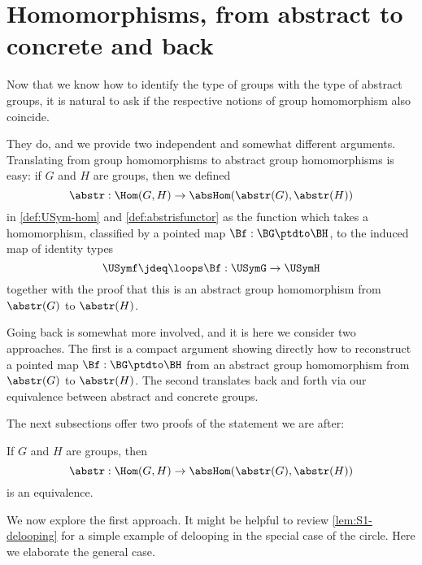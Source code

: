 \section{Homomorphisms, from abstract to concrete and back}
\label{sec:homabsisconcr}

Now that we know how to identify the type of groups with the type 
of abstract groups, it is natural to ask if the respective notions of 
group homomorphism also coincide.

They do, and we provide two independent and somewhat different arguments.
Translating from group homomorphisms to abstract group homomorphisms is easy:
if $G$ and $H$ are groups, then we defined
$$\abstr:\Hom(G,H)\to\absHom(\abstr(G),\abstr(H))$$
in \cref{def:USym-hom} and \cref{def:abstrisfunctor} as the function
which takes a homomorphism, classified by a pointed map $\Bf:\BG\ptdto\BH$,
to the induced map of identity types
$$\USymf \jdeq \loops\Bf:\USymG\to\USymH$$
together with the proof that this is an abstract group 
homomorphism from $\abstr(G)$ to $\abstr(H)$.

Going back is somewhat more involved, and it is here we consider
two approaches. The first is a compact argument showing directly how to
reconstruct a pointed map $\Bf:\BG\ptdto\BH$ from an abstract group
homomorphism from $\abstr(G)$ to $\abstr(H)$. The second translates 
back and forth via our equivalence between abstract and concrete groups.

The next subsections offer two proofs of the statement we are after:
\begin{lemma}
  \label{lem:homomabstrconcr}
  If $G$ and $H$ are groups, then
$$\abstr:\Hom(G,H)\to\absHom(\abstr(G),\abstr(H))$$
is an equivalence.
\end{lemma}

\label{sec:delooping} %
We now explore the first approach.
It might be helpful to review \cref{lem:S1-delooping}
for a simple example of delooping in the special case of the circle.
Here we elaborate the general case.

